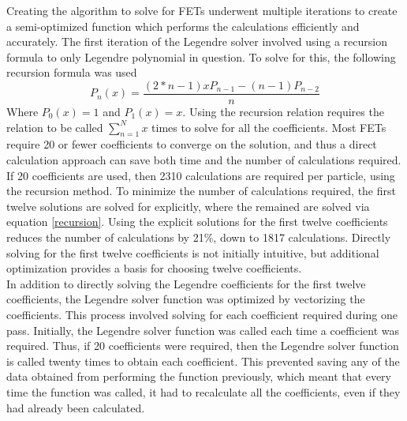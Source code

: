 \documentclass[10tma4paper]{article}
\begin{document}
Creating the algorithm to solve for FETs underwent multiple iterations to create a semi-optimized function which performs the calculations efficiently and accurately. The first iteration of the Legendre solver involved using a recursion formula to only Legendre polynomial in question. To solve for this, the following recursion formula was used
\begin{equation}\label{recursion}
P_{n}(x) = \frac{(2*n-1)xP_{n-1}-(n-1)P_{n-2}}{n}
\end{equation}
Where $P_{0}(x)=1$ and $P_{1}(x)=x$. Using the recursion relation requires the relation to be called $\sum_{n=1}^{N}x$ times to solve for all the coefficients. Most FETs require 20 or fewer coefficients to converge on the solution, and thus a direct calculation approach can save both time and the number of calculations required. If 20 coefficients are used, then 2310 calculations are required per particle, using the recursion method. To minimize the number of calculations required, the first twelve solutions are solved for explicitly, where the remained are solved via equation \eqref{recursion}. Using the explicit solutions for the first twelve coefficients reduces the number of calculations by 21\%, down to 1817 calculations. Directly solving for the first twelve coefficients is not initially intuitive, but additional optimization provides a basis for choosing twelve coefficients.
\\
In addition to directly solving the Legendre coefficients for the first twelve coefficients, the Legendre solver function was optimized by vectorizing the coefficients. This process involved solving for each coefficient required during one pass. Initially, the Legendre solver function was called each time a coefficient was required. Thus, if 20 coefficients were required, then the Legendre solver function is called twenty times to obtain each coefficient. This prevented saving any of the data obtained from performing the function previously, which meant that every time the function was called, it had to recalculate all the coefficients, even if they had already been calculated.
\\ 
\end{document}
